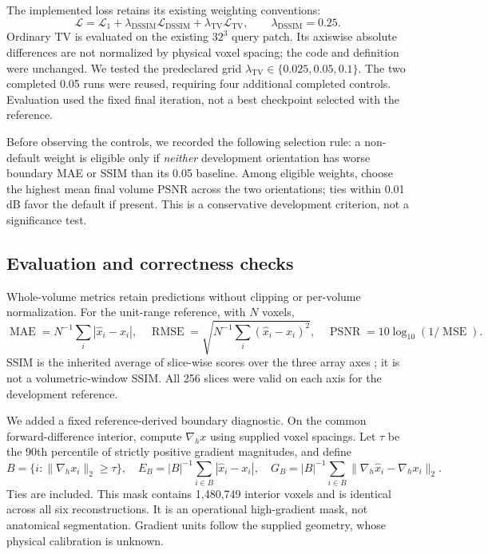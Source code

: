 \documentclass[10pt,a4paper]{article}
\begin{document}
The implemented loss retains its existing weighting conventions:
\begin{equation}
\mathcal L=\mathcal L_1+
\lambda_{\mathrm{DSSIM}}\mathcal L_{\mathrm{DSSIM}}+
\lambda_{\mathrm{TV}}\mathcal L_{\mathrm{TV}},\qquad
\lambda_{\mathrm{DSSIM}}=0.25.
\end{equation}
Ordinary TV is evaluated on the existing $32^3$ query patch. Its axiswise absolute differences are not normalized by physical voxel spacing; the code and definition were unchanged. We tested the predeclared grid $\lambda_{\mathrm{TV}}\in\{0.025,0.05,0.1\}$. The two completed 0.05 runs were reused, requiring four additional completed controls. Evaluation used the fixed final iteration, not a best checkpoint selected with the reference.

Before observing the controls, we recorded the following selection rule: a non-default weight is eligible only if \emph{neither} development orientation has worse boundary MAE or SSIM than its 0.05 baseline. Among eligible weights, choose the highest mean final volume PSNR across the two orientations; ties within 0.01 dB favor the default if present. This is a conservative development criterion, not a significance test.

\subsection{Evaluation and correctness checks}
Whole-volume metrics retain predictions without clipping or per-volume normalization. For the unit-range reference, with $N$ voxels,
\begin{equation}
\operatorname{MAE}=N^{-1}\sum_i|\hat x_i-x_i|,\quad
\operatorname{RMSE}=\sqrt{N^{-1}\sum_i(\hat x_i-x_i)^2},\quad
\operatorname{PSNR}=10\log_{10}(1/\operatorname{MSE}).
\end{equation}
SSIM is the inherited average of slice-wise scores over the three array axes \cite{ssim}; it is not a volumetric-window SSIM. All 256 slices were valid on each axis for the development reference.

We added a fixed reference-derived boundary diagnostic. On the common forward-difference interior, compute $\nabla_h x$ using supplied voxel spacings. Let $\tau$ be the 90th percentile of strictly positive gradient magnitudes, and define
\begin{equation}
B=\{i:\|\nabla_h x_i\|_2\geq\tau\},\quad
E_B=|B|^{-1}\sum_{i\in B}|\hat x_i-x_i|,\quad
G_B=|B|^{-1}\sum_{i\in B}\|\nabla_h\hat x_i-\nabla_h x_i\|_2.
\end{equation}
Ties are included. This mask contains 1,480,749 interior voxels and is identical across all six reconstructions. It is an operational high-gradient mask, not anatomical segmentation. Gradient units follow the supplied geometry, whose physical calibration is unknown.
\end{document}
